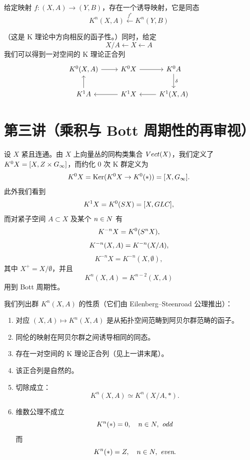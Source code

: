 给定映射 $f : (X,A)\to(Y,B)$，存在一个诱导映射，它是同态
\[ K^n(X,A)\xleftarrow{f^*} K^n(Y,B) \]

（这是 K 理论中方向相反的函子性。）同时，给定
\[ X/A\leftarrow X\leftarrow A \]
我们可以得到一对空间的 K 理论正合列
\[
\begin{tikzcd}
K^0(X,A) \arrow[r] & K^0X \arrow[r] & K^0A \arrow[d,"\delta"] \\
K^1A \arrow[u] & K^1X \arrow[l] & K^1(X,A) \arrow[l]
\end{tikzcd}
\]


\section{第三讲（乘积与 Bott 周期性的再审视）}

设 $X$ 紧且连通。由 $X$ 上向量丛的同构类集合 $Vect(X)$，我们定义了 $K^0X = [X, Z\times G_\infty]$，而约化 0 次 K 群定义为
\[  K^0X = \operatorname{Ker}(K^0X\to K^0(*)) = [X, G_\infty]. \]
此外我们看到
\[  K^1X =  K^0(SX) = [X, GLC], \]
而对紧子空间 $A\subset X$ 及某个 $n\in N$ 有
\[  K^{-n}X =  K^0(S^nX), \]
\[  K^{-n}(X,A) =  K^{-n}(X/A), \]
\[ K^{-n}X = K^{-n}(X,\emptyset), \]
其中 $X^+ = X/\emptyset$，并且
\[ K^n(X,A) = K^{n-2}(X,A) \]
用到 Bott 周期性。


我们列出群 $K^n(X,A)$ 的性质（它们由 Eilenberg--Steenroad 公理推出）：

\begin{enumerate}[label=\arabic*.]
\item 对应 $(X,A)\mapsto K^n(X,A)$ 是从拓扑空间范畴到阿贝尔群范畴的函子。
\item 同伦的映射在阿贝尔群之间诱导相同的同态。
\item 存在一对空间的 K 理论正合列（见上一讲末尾）。

\item 该正合列是自然的。
\item 切除成立：
\[ K^n(X,A)\simeq K^n(X/A,*). \]
\item 维数公理不成立
\[ K^n(*) = 0,\quad n\in N,\ \textit{odd} \]
而
\[ K^n(*) = Z,\quad n\in N,\ \textit{even}. \]
\end{enumerate}

